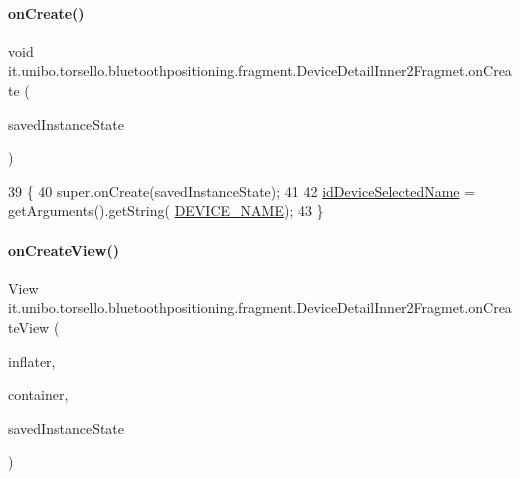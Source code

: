 \paragraph{\texorpdfstring{on\+Create()}{onCreate()}}
{\footnotesize\ttfamily void it.\+unibo.\+torsello.\+bluetoothpositioning.\+fragment.\+Device\+Detail\+Inner2\+Fragmet.\+on\+Create (\begin{DoxyParamCaption}\item[{Bundle}]{saved\+Instance\+State }\end{DoxyParamCaption})}


\begin{DoxyCode}
39                                                     \{
40         super.onCreate(savedInstanceState);
41 
42         \hyperlink{classit_1_1unibo_1_1torsello_1_1bluetoothpositioning_1_1fragment_1_1DeviceDetailInner2Fragmet_a45380c45eac10e58571b19e50c9fc27c_a45380c45eac10e58571b19e50c9fc27c}{idDeviceSelectedName} = getArguments().getString(
      \hyperlink{classit_1_1unibo_1_1torsello_1_1bluetoothpositioning_1_1fragment_1_1DeviceDetailInner2Fragmet_a8e8968fb34c3ad56d582196879b0ef6c_a8e8968fb34c3ad56d582196879b0ef6c}{DEVICE\_NAME});
43     \}
\end{DoxyCode}
\hypertarget{classit_1_1unibo_1_1torsello_1_1bluetoothpositioning_1_1fragment_1_1DeviceDetailInner2Fragmet_a74a36f897121676ecad563c25b484018_a74a36f897121676ecad563c25b484018}{}\label{classit_1_1unibo_1_1torsello_1_1bluetoothpositioning_1_1fragment_1_1DeviceDetailInner2Fragmet_a74a36f897121676ecad563c25b484018_a74a36f897121676ecad563c25b484018} 
\paragraph{\texorpdfstring{on\+Create\+View()}{onCreateView()}}
{\footnotesize\ttfamily View it.\+unibo.\+torsello.\+bluetoothpositioning.\+fragment.\+Device\+Detail\+Inner2\+Fragmet.\+on\+Create\+View (\begin{DoxyParamCaption}\item[{Layout\+Inflater}]{inflater,  }\item[{View\+Group}]{container,  }\item[{Bundle}]{saved\+Instance\+State }\end{DoxyParamCaption})}


